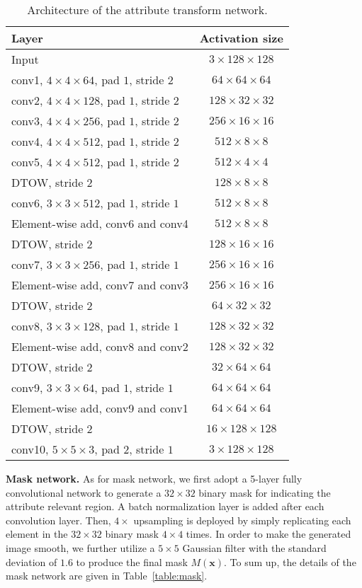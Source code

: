 \documentclass[journal]{IEEEtran}
\begin{document}
\begin{table}[htb]
\caption{Architecture of the attribute transform network.}
\footnotesize
\begin{center}
\begin{tabular}{l|c}
\hline
Layer&  Activation size  \\
\hline
Input& $3\times128\times128$ \\
conv1, $4\times4\times64$, pad $1$, stride $2$ & $64\times64\times64$ \\
conv2, $4\times4\times128$, pad $1$, stride $2$ & $128\times32\times32$ \\
conv3, $4\times4\times256$, pad $1$, stride $2$ & $256\times16\times16$ \\
conv4, $4\times4\times512$, pad $1$, stride $2$ & $512\times8\times8$ \\
conv5, $4\times4\times512$, pad $1$, stride $2$ & $512\times4\times4$ \\
DTOW, stride 2 & $128\times8\times8$\\
conv6, $3\times3\times512$, pad $1$, stride $1$ & $512\times8\times8$ \\
Element-wise add, conv6 and conv4 & $512\times8\times8$\\
DTOW, stride 2 & $128\times16\times16$\\
conv7, $3\times3\times256$, pad $1$, stride $1$ & $256\times16\times16$ \\
Element-wise add, conv7 and conv3 & $256\times16\times16$\\
DTOW, stride 2 & $64\times32\times32$\\
conv8, $3\times3\times128$, pad $1$, stride $1$ & $128\times32\times32$ \\
Element-wise add, conv8 and conv2 & $128\times32\times32$\\
DTOW, stride 2 & $32\times64\times64$\\
conv9, $3\times3\times64$, pad $1$, stride $1$ & $64\times64\times64$ \\
Element-wise add, conv9 and conv1 & $64\times64\times64$\\
DTOW, stride 2 & $16\times128\times128$\\
conv10, $5\times5\times3$, pad $2$, stride $1$ &
$3\times128\times128$\\
\hline
\end{tabular}
\end{center}
\label{table:transfer}
\end{table}


\textbf{Mask network.}
As for mask network, we first adopt a 5-layer fully convolutional network to generate a $32 \times 32$ binary mask for indicating the attribute relevant region.
A batch normalization layer is added after each convolution layer.
Then, $4\times$ upsampling is deployed by simply replicating each element in the $32 \times 32$ binary mask $4\times 4$ times.
In order to make the generated image smooth, we further utilize a $5\times5$ Gaussian filter with the standard deviation of $1.6$ to produce the final mask $M(\mathbf{x})$.
To sum up, the details of the mask network are given in Table~\ref{table:mask}.
\end{document}
